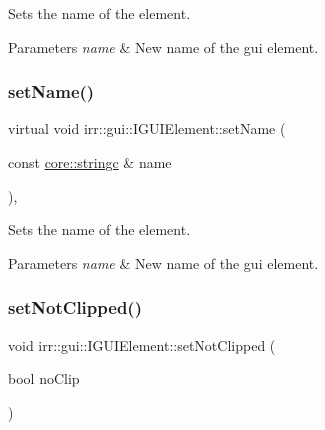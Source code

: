 Sets the name of the element. 


\begin{DoxyParams}{Parameters}
{\em name} & New name of the gui element. \\
\hline
\end{DoxyParams}
\mbox{\label{classirr_1_1gui_1_1IGUIElement_a5e318b47fece6d4157a1d7ccf401f1c8}} 
\subsubsection{\texorpdfstring{set\+Name()}{setName()}\hspace{0.1cm}{\footnotesize\ttfamily [2/2]}}
{\footnotesize\ttfamily virtual void irr\+::gui\+::\+I\+G\+U\+I\+Element\+::set\+Name (\begin{DoxyParamCaption}\item[{const \hyperlink{namespaceirr_1_1core_ade1071a878633f2f6d8a75c5d11fec19}{core\+::stringc} \&}]{name }\end{DoxyParamCaption})\hspace{0.3cm}{\ttfamily [inline]}, {\ttfamily [virtual]}}



Sets the name of the element. 


\begin{DoxyParams}{Parameters}
{\em name} & New name of the gui element. \\
\hline
\end{DoxyParams}
\mbox{\label{classirr_1_1gui_1_1IGUIElement_a814d322989acafa74c895e5c13908b86}} 
\subsubsection{\texorpdfstring{set\+Not\+Clipped()}{setNotClipped()}}
{\footnotesize\ttfamily void irr\+::gui\+::\+I\+G\+U\+I\+Element\+::set\+Not\+Clipped (\begin{DoxyParamCaption}\item[{bool}]{no\+Clip }\end{DoxyParamCaption})\hspace{0.3cm}{\ttfamily [inline]}}



